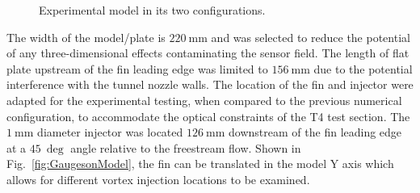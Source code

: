 \documentclass{AIAA}
\begin{document}


%
\begin{figure}[!h]
\center
{}
\caption{Experimental model in its two configurations.}
\label{fig:ModelPics}
\end{figure} 


The width of the model/plate is $\SI{220}{\milli\meter}$ and was selected to reduce the potential of any three-dimensional effects contaminating the sensor field.
The length of flat plate upstream of the fin leading edge was limited to $\SI{156}{\milli\meter}$ due to the potential interference with the tunnel nozzle walls.
The location of the fin and injector were adapted for the experimental testing, when compared to the previous numerical configuration, to accommodate the optical constraints of the T4 test section.
The $\SI{1}{\milli\meter}$ diameter injector was located $\SI{126}{\milli\meter}$ downstream of the fin leading edge at a $\SI{45}{\deg}$ angle relative to the freestream flow.
Shown in Fig.~\ref{fig:GaugesonModel}, the fin can be translated in the model Y axis
which allows for different vortex injection locations to be examined. 
\end{document}
